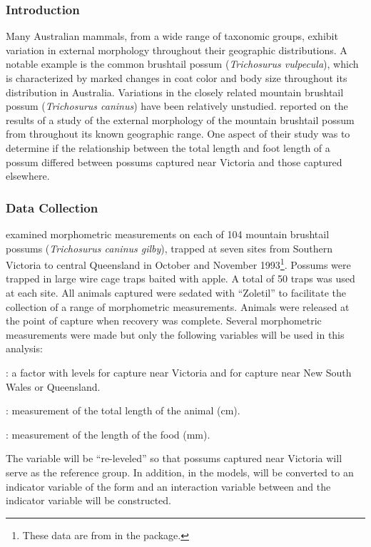 \documentclass[10pt,openany]{book}\usepackage[]{graphicx}\usepackage[]{color}
\begin{document}
\subsubsection*{Introduction}
Many Australian mammals, from a wide range of taxonomic groups, exhibit variation in external morphology throughout their geographic distributions.  A notable example is the common brushtail possum (\emph{Trichosurus vulpecula}), which is characterized by marked changes in coat color and body size throughout its distribution in Australia.  Variations in the closely related mountain brushtail possum (\emph{Trichosurus caninus}) have been relatively unstudied.  \cite{Lindenmayeretal1995} reported on the results of a study of the external morphology of the mountain brushtail possum from throughout its known geographic range.  One aspect of their study was to determine if the relationship between the total length and foot length of a possum differed between possums captured near Victoria and those captured elsewhere.

\subsubsection*{Data Collection}
\cite{Lindenmayeretal1995} examined morphometric measurements on each of 104 mountain brushtail possums (\emph{Trichosurus caninus gilby}), trapped at seven sites from Southern Victoria to central Queensland in October and November 1993\footnote{These data are from  in the  package.}.  Possums were trapped in large wire cage traps baited with apple.  A total of 50 traps was used at each site.  All animals captured were sedated with ``Zoletil'' to facilitate the collection of a range of morphometric measurements.  Animals were released at the point of capture when recovery was complete.  Several morphometric measurements were made but only the following variables will be used in this analysis:
\begin{Itemize}
  \item {}: a factor with levels  for capture near Victoria and  for capture near New South Wales or Queensland.
  \item {}: measurement of the total length of the animal (cm).
  \item {}: measurement of the length of the food (mm).
\end{Itemize}
The  variable will be ``re-leveled'' so that possums captured near Victoria will serve as the reference group.  In addition, in the models,  will be converted to an indicator variable of the form  and an interaction variable between  and the indicator variable will be constructed.
\end{document}
